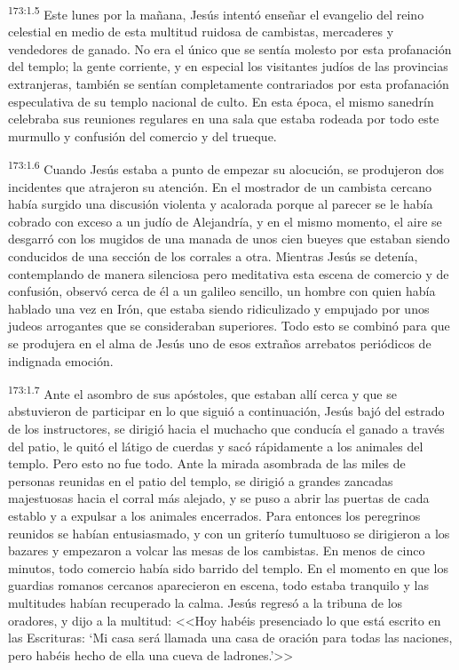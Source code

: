 \par 
\textsuperscript{173:1.5} Este lunes por la mañana, Jesús intentó enseñar el evangelio del reino celestial en medio de esta multitud ruidosa de cambistas, mercaderes y vendedores de ganado. No era el único que se sentía molesto por esta profanación del templo; la gente corriente, y en especial los visitantes judíos de las provincias extranjeras, también se sentían completamente contrariados por esta profanación especulativa de su templo nacional de culto. En esta época, el mismo sanedrín celebraba sus reuniones regulares en una sala que estaba rodeada por todo este murmullo y confusión del comercio y del trueque.

\par 
\textsuperscript{173:1.6} Cuando Jesús estaba a punto de empezar su alocución, se produjeron dos incidentes que atrajeron su atención. En el mostrador de un cambista cercano había surgido una discusión violenta y acalorada porque al parecer se le había cobrado con exceso a un judío de Alejandría, y en el mismo momento, el aire se desgarró con los mugidos de una manada de unos cien bueyes que estaban siendo conducidos de una sección de los corrales a otra. Mientras Jesús se detenía, contemplando de manera silenciosa pero meditativa esta escena de comercio y de confusión, observó cerca de él a un galileo sencillo, un hombre con quien había hablado una vez en Irón, que estaba siendo ridiculizado y empujado por unos judeos arrogantes que se consideraban superiores. Todo esto se combinó para que se produjera en el alma de Jesús uno de esos extraños arrebatos periódicos de indignada emoción.

\par 
\textsuperscript{173:1.7} Ante el asombro de sus apóstoles, que estaban allí cerca y que se abstuvieron de participar en lo que siguió a continuación, Jesús bajó del estrado de los instructores, se dirigió hacia el muchacho que conducía el ganado a través del patio, le quitó el látigo de cuerdas y sacó rápidamente a los animales del templo. Pero esto no fue todo. Ante la mirada asombrada de las miles de personas reunidas en el patio del templo, se dirigió a grandes zancadas majestuosas hacia el corral más alejado, y se puso a abrir las puertas de cada establo y a expulsar a los animales encerrados. Para entonces los peregrinos reunidos se habían entusiasmado, y con un griterío tumultuoso se dirigieron a los bazares y empezaron a volcar las mesas de los cambistas. En menos de cinco minutos, todo comercio había sido barrido del templo. En el momento en que los guardias romanos cercanos aparecieron en escena, todo estaba tranquilo y las multitudes habían recuperado la calma. Jesús regresó a la tribuna de los oradores, y dijo a la multitud: <<Hoy habéis presenciado lo que está escrito en las Escrituras: `Mi casa será llamada una casa de oración para todas las naciones, pero habéis hecho de ella una cueva de ladrones.'>>

